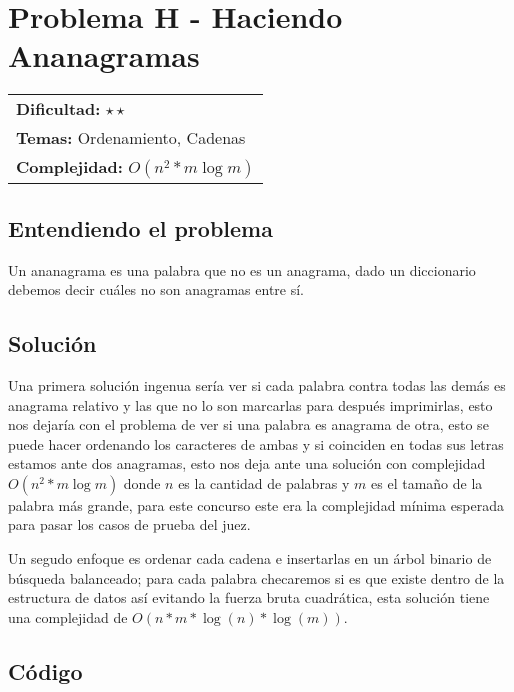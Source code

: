 \section{Problema H - Haciendo Ananagramas}

\hfill
\begin{tabular}{@{}l@{}}
\textbf{Dificultad:} $\star \star$ \\
\textbf{Temas:} Ordenamiento, Cadenas \\
\textbf{Complejidad:} $O(n^2 * m \log m)$
\end{tabular}

\subsection*{Entendiendo el problema}
Un ananagrama es una palabra que no es un anagrama, dado un diccionario debemos decir cuáles no son anagramas entre sí.
\subsection*{Solución}
Una primera solución ingenua sería ver si cada palabra contra
todas las demás es anagrama relativo y las que no lo son 
marcarlas para después imprimirlas, esto nos dejaría con el 
problema de ver si una palabra es anagrama de otra, esto se 
puede hacer ordenando los caracteres de ambas y si coinciden en
todas sus letras estamos ante dos anagramas, esto nos deja 
ante una solución con complejidad $O(n^2 * m \log m)$ donde 
$n$ es la cantidad de palabras y $m$ es el tamaño de la 
palabra más grande, para este concurso este era la 
complejidad mínima esperada para pasar los casos de prueba 
del juez.

Un segudo enfoque es ordenar cada cadena e insertarlas en un árbol binario de 
búsqueda balanceado; para cada palabra checaremos si es 
que existe dentro de la estructura de datos así evitando la
fuerza bruta cuadrática, esta solución tiene una complejidad de $O(n*m * \log (n) * \log (m))$.

\subsection*{Código}

